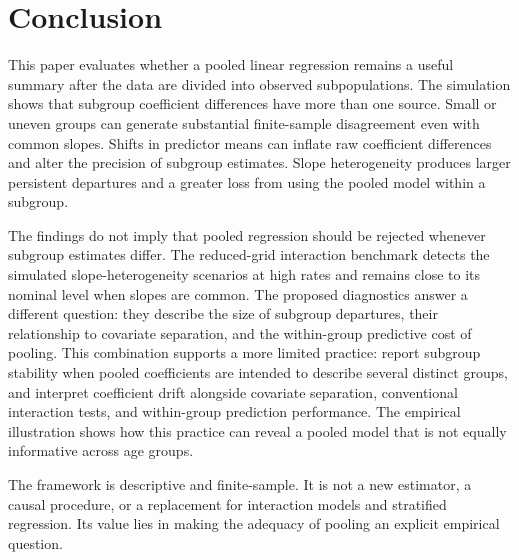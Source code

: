 \section{Conclusion}\label{sec:conclusion}

This paper evaluates whether a pooled linear regression remains a useful summary after the data are divided into observed subpopulations. The simulation shows that subgroup coefficient differences have more than one source. Small or uneven groups can generate substantial finite-sample disagreement even with common slopes. Shifts in predictor means can inflate raw coefficient differences and alter the precision of subgroup estimates. Slope heterogeneity produces larger persistent departures and a greater loss from using the pooled model within a subgroup.

The findings do not imply that pooled regression should be rejected whenever subgroup estimates differ. The reduced-grid interaction benchmark detects the simulated slope-heterogeneity scenarios at high rates and remains close to its nominal level when slopes are common. The proposed diagnostics answer a different question: they describe the size of subgroup departures, their relationship to covariate separation, and the within-group predictive cost of pooling. This combination supports a more limited practice: report subgroup stability when pooled coefficients are intended to describe several distinct groups, and interpret coefficient drift alongside covariate separation, conventional interaction tests, and within-group prediction performance. The empirical illustration shows how this practice can reveal a pooled model that is not equally informative across age groups.

The framework is descriptive and finite-sample. It is not a new estimator, a causal procedure, or a replacement for interaction models and stratified regression. Its value lies in making the adequacy of pooling an explicit empirical question.
